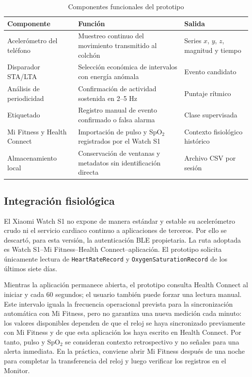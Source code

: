 \documentclass[12pt]{article}
\begin{document}
\begin{table}[H]
\centering
\caption{Componentes funcionales del prototipo}
\begin{tabularx}{\textwidth}{>{\raggedright\arraybackslash}p{3.2cm}X X}
\toprule
Componente & Función & Salida \\
\midrule
Acelerómetro del teléfono & Muestreo continuo del movimiento transmitido al colchón & Series $x$, $y$, $z$, magnitud y tiempo \\
Disparador STA/LTA & Selección económica de intervalos con energía anómala & Evento candidato \\
Análisis de periodicidad & Confirmación de actividad sostenida en 2--5 Hz & Puntaje rítmico \\
Etiquetado & Registro manual de evento confirmado o falsa alarma & Clase supervisada \\
Mi Fitness y Health Connect & Importación de pulso y SpO$_2$ registrados por el Watch S1 & Contexto fisiológico histórico \\
Almacenamiento local & Conservación de ventanas y metadatos sin identificación directa & Archivo CSV por sesión \\
\bottomrule
\end{tabularx}
\end{table}

\subsection{Integración fisiológica}

El Xiaomi Watch S1 no expone de manera estándar y estable su acelerómetro crudo ni el servicio cardiaco continuo a aplicaciones de terceros. Por ello se descartó, para esta versión, la autenticación BLE propietaria. La ruta adoptada es Watch S1--Mi Fitness--Health Connect--aplicación. El prototipo solicita únicamente lectura de \texttt{HeartRateRecord} y \texttt{OxygenSaturationRecord} de los últimos siete días.

Mientras la aplicación permanece abierta, el prototipo consulta Health Connect al iniciar y cada 60 segundos; el usuario también puede forzar una lectura manual. Este intervalo iguala la frecuencia operacional prevista para la sincronización automática con Mi Fitness, pero no garantiza una nueva medición cada minuto: los valores disponibles dependen de que el reloj se haya sincronizado previamente con Mi Fitness y de que esta aplicación los haya escrito en Health Connect. Por tanto, pulso y SpO$_2$ se consideran contexto retrospectivo y no señales para una alerta inmediata. En la práctica, conviene abrir Mi Fitness después de una noche para completar la transferencia del reloj y luego verificar los registros en el Monitor.
\end{document}
